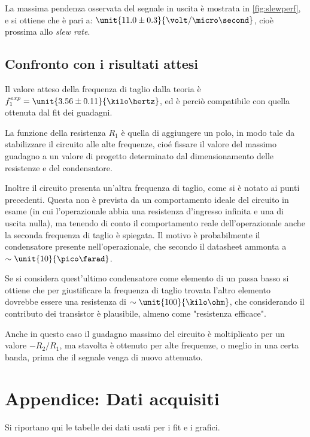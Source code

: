 \documentclass[10pt,a4paper]{article}
\begin{document}
La massima pendenza osservata del segnale in uscita è mostrata in \figurename{\ref{fig:slewperf}}, e si ottiene che è pari a: $\unit{11.0 \pm 0.3}{\volt/\micro\second}$, cioè prossima allo \emph{slew rate}.


\subsection{Confronto con i risultati attesi}

Il valore atteso della frequenza di taglio dalla teoria è $f_1^{exp} = \unit{3.56 \pm 0.11}{\kilo\hertz}$, ed è perciò compatibile con quella ottenuta dal fit dei guadagni.


La funzione della resistenza $R_1$ è quella di aggiungere un polo, in modo tale da stabilizzare il circuito alle alte frequenze, cioé fissare il valore del massimo guadagno a un valore di progetto determinato dal dimensionamento delle resistenze e del condensatore.

Inoltre il circuito presenta un'altra frequenza di taglio, come si è notato ai punti precedenti. Questa non è prevista da un comportamento ideale del circuito in esame (in cui l'operazionale abbia una resistenza d'ingresso infinita e una di uscita nulla), ma tenendo di conto il comportamento reale dell'operazionale anche la seconda frequenza di taglio è spiegata. Il motivo è probabilmente il condensatore presente nell'operazionale, che secondo il datasheet ammonta a $\sim \unit{10}{\pico\farad}$.

Se si considera quest'ultimo condensatore come elemento di un passa basso si ottiene che per giustificare la frequenza di taglio trovata l'altro elemento dovrebbe essere una resistenza di $\sim \unit{100}{\kilo\ohm}$, che considerando il contributo dei transistor è plausibile, almeno come "resistenza efficace".

Anche in questo caso il guadagno massimo del circuito è moltiplicato per un valore $-R_2/R_1$, ma stavolta è ottenuto per alte frequenze, o meglio in una certa banda, prima che il segnale venga di nuovo attenuato.

\pagebreak
\section{Appendice: Dati acquisiti}
Si riportano qui le tabelle dei dati usati per i fit e i grafici.
\end{document}
